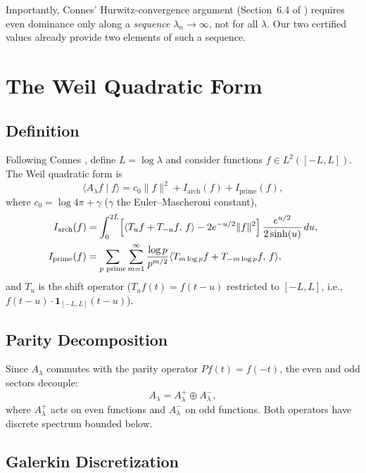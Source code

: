 \documentclass[12pt,a4paper]{article}
\theoremstyle{definition}
\theoremstyle{remark}
\begin{document}
Importantly, Connes' Hurwitz-convergence argument (Section~6.4 of \cite{Connes2025}) requires even dominance only along a \emph{sequence} $\lambda_n \to \infty$, not for all $\lambda$. Our two certified values already provide two elements of such a sequence.


\section{The Weil Quadratic Form}
\label{sec:weil}

\subsection{Definition}

Following Connes \cite{Connes2025}, define $L = \log\lambda$ and consider functions $f \in L^2([-L,L])$. The Weil quadratic form is
\begin{equation}
\label{eq:QW}
\langle A_\lambda f \mid f \rangle = c_0 \|f\|^2 + I_{\mathrm{arch}}(f) + I_{\mathrm{prime}}(f),
\end{equation}
where $c_0 = \log 4\pi + \gamma$ ($\gamma$ the Euler--Mascheroni constant),
\begin{align}
I_{\mathrm{arch}}(f) &= \int_0^{2L} \Bigl[\langle T_u f + T_{-u} f,\, f \rangle - 2e^{-u/2}\|f\|^2\Bigr]\,\frac{e^{u/2}}{2\sinh(u)}\,du, \label{eq:arch} \\
I_{\mathrm{prime}}(f) &= \sum_{p\text{ prime}} \sum_{m=1}^{\infty} \frac{\log p}{p^{m/2}} \langle T_{m\log p} f + T_{-m\log p} f,\, f \rangle, \label{eq:prime}
\end{align}
and $T_u$ is the shift operator ($T_u f(t) = f(t-u)$ restricted to $[-L,L]$, i.e., $f(t-u)\cdot\mathbf{1}_{[-L,L]}(t-u)$).

\subsection{Parity Decomposition}

Since $A_\lambda$ commutes with the parity operator $Pf(t) = f(-t)$, the even and odd sectors decouple:
\[
A_\lambda = A_\lambda^+ \oplus A_\lambda^-,
\]
where $A_\lambda^+$ acts on even functions and $A_\lambda^-$ on odd functions. Both operators have discrete spectrum bounded below.

\subsection{Galerkin Discretization}
\end{document}
